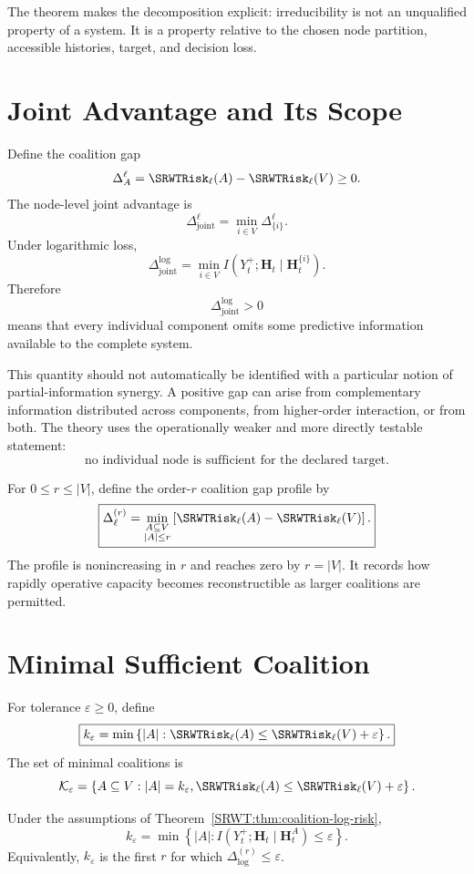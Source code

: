 The theorem makes the decomposition explicit: irreducibility is not an
unqualified property of a system. It is a property relative to the chosen node
partition, accessible histories, target, and decision loss.

\section{Joint Advantage and Its Scope}

Define the coalition gap
\[
\Delta_A^{\ell}
=
\SRWTRisk_\ell(A)-\SRWTRisk_\ell(V)
\geq0.
\]
The node-level joint advantage is
\[
\boxed{
\Delta_{\mathrm{joint}}^{\ell}
=
\min_{i\in V}
\Delta_{\{i\}}^{\ell}.
}
\]
Under logarithmic loss,
\[
\boxed{
\Delta_{\mathrm{joint}}^{\log}
=
\min_{i\in V}
I\!\left(
Y_t^+;\mathbf H_t
\mid
\mathbf H_t^{\{i\}}
\right).
}
\]
Therefore
\[
\Delta_{\mathrm{joint}}^{\log}>0
\]
means that every individual component omits some predictive information
available to the complete system.

This quantity should not automatically be identified with a particular notion
of partial-information synergy. A positive gap can arise from complementary
information distributed across components, from higher-order interaction, or
from both. The theory uses the operationally weaker and more directly
testable statement:
\[
\text{no individual node is sufficient for the declared target.}
\]

For \(0\leq r\leq |V|\), define the order-\(r\) coalition gap profile by
\[
\boxed{
\Delta^{(r)}_\ell
=
\min_{\substack{A\subseteq V\\|A|\leq r}}
\left[
\SRWTRisk_\ell(A)-\SRWTRisk_\ell(V)
\right].
}
\]
The profile is nonincreasing in \(r\) and reaches zero by \(r=|V|\).
It records how rapidly operative capacity becomes reconstructible as larger
coalitions are permitted.

\section{Minimal Sufficient Coalition}

For tolerance \(\varepsilon\geq0\), define
\[
\boxed{
k_\varepsilon
=
\min\left\{
|A|:
\SRWTRisk_\ell(A)
\leq
\SRWTRisk_\ell(V)+\varepsilon
\right\}.
}
\]
The set of minimal coalitions is
\[
\mathcal K_\varepsilon
=
\left\{
A\subseteq V:
|A|=k_\varepsilon,
\SRWTRisk_\ell(A)
\leq
\SRWTRisk_\ell(V)+\varepsilon
\right\}.
\]

\begin{SRWTcorollary}
Under the assumptions of Theorem~\ref{SRWT:thm:coalition-log-risk},
\[
\boxed{
k_\varepsilon
=
\min\left\{
|A|:
I(Y_t^+;\mathbf H_t\mid\mathbf H_t^A)
\leq\varepsilon
\right\}.
}
\]
Equivalently, \(k_\varepsilon\) is the first \(r\) for which
\(\Delta_{\log}^{(r)}\leq\varepsilon\).
\end{SRWTcorollary}

